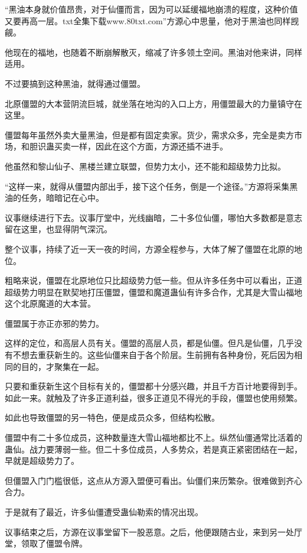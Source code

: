 
\begin{this_body}

“黑油本身就价值昂贵，对于仙僵而言，因为可以延缓福地崩溃的程度，这种价值又要再高一层。txt全集下载www.80txt.com”方源心中思量，他对于黑油也同样觊觎。

他现在的福地，也随着不断崩解散灭，缩减了许多领土空间。黑油对他来讲，同样适用。

不过要搞到这种黑油，就得通过僵盟。

北原僵盟的大本营阴流巨城，就坐落在地沟的入口上方，用僵盟最大的力量镇守在这里。

僵盟每年虽然外卖大量黑油，但是都有固定卖家。货少，需求众多，完全是卖方市场，和胆识蛊买卖一样，因此在这个方面，方源还插不进手。

他虽然和黎山仙子、黑楼兰建立联盟，但势力太小，还不能和超级势力比拟。

“这样一来，就得从僵盟内部出手，接下这个任务，倒是一个途径。”方源将采集黑油的任务，暗暗记在心中。

议事继续进行下去。议事厅堂中，光线幽暗，二十多位仙僵，哪怕大多数都是意志留在这里，也显得阴气深沉。

整个议事，持续了近一天一夜的时间，方源全程参与，大体了解了僵盟在北原的地位。

粗略来说，僵盟在北原地位只比超级势力低一些。但从许多任务中可以看出，正道超级势力明显在默契地打压僵盟，僵盟和魔道蛊仙有许多合作，尤其是大雪山福地这个北原魔道的大本营。

僵盟属于亦正亦邪的势力。

这样的定位，和高层人员有关。僵盟的高层人员，都是仙僵。但凡是仙僵，几乎没有不想去重获新生的。这些仙僵来自于各个阶层。生前拥有各种身份，死后因为相同的目的，才聚集在一起。

只要和重获新生这个目标有关的，僵盟都十分感兴趣，并且千方百计地要得到手。如此一来。就触及了许多正道利益，很多正道见不得光的手段，僵盟也使用频繁。

如此也导致僵盟的另一特色，便是成员众多，但结构松散。

僵盟中有二十多位成员，这种数量连大雪山福地都比不上。纵然仙僵通常比活着的蛊仙。战力要薄弱一些。但二十多位成员，人多势众，若是真正紧密团结在一起，早就是超级势力了。

但僵盟入门门槛很低，这点从方源入盟便可看出。仙僵们来历繁杂。很难做到齐心合力。

于是就有了最近，许多仙僵遭受蛊仙勒索的情况出现。

议事结束之后，方源在议事堂留下一股恶意。之后，他便跟随古业，来到另一处厅堂，领取了僵盟令牌。


\end{this_body}
